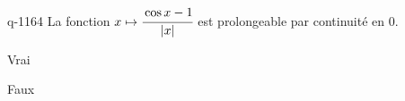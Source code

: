 \begin{truefalse}{q-1164}
La fonction $x\mapsto \cfrac{\cos x-1}{|x|}$ est prolongeable par continuité en $0$.
\item* Vrai
\item Faux
\end{truefalse}

